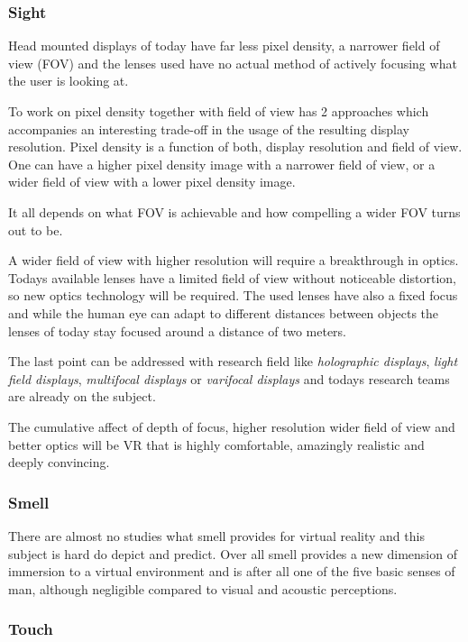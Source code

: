 \subsubsection{Sight}

Head mounted displays of today have far less pixel density, a narrower field of view (FOV) and the lenses used have no actual method of actively focusing what the user is looking at.

To work on pixel density together with field of view has 2 approaches which accompanies an interesting trade-off in the usage of the resulting display resolution. Pixel density is a function of both, display resolution and field of view. One can have a higher pixel density image with a narrower field of view, or a wider field of view with a lower pixel density image. 

It all depends on what FOV is achievable and how compelling a wider FOV turns out to be.

A wider field of view with higher resolution will require a breakthrough in optics. Todays available lenses have a limited field of view without noticeable distortion, so new optics technology will be required.
The used lenses have also a fixed focus and while the human eye can adapt to different distances between objects the lenses of today stay focused around a distance of two meters.

The last point can be addressed with research field like \textit{holographic displays}, \textit{light field displays}, \textit{multifocal displays} or \textit{varifocal displays} and todays research teams are already on the subject.

The cumulative affect of depth of focus, higher resolution wider field of view and better optics will be VR that is highly comfortable, amazingly realistic and deeply convincing.

\subsubsection{Smell}

There are almost no studies what smell provides for virtual reality and this subject is hard do depict and predict. Over all smell provides a new dimension of immersion to a virtual environment and is after all one of the five basic senses of man, although negligible compared to visual and acoustic perceptions.

\subsubsection{Touch}

